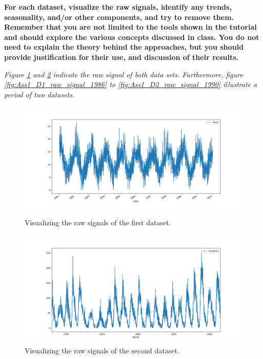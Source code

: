 \item \textbf{For each dataset, visualize the raw signals, identify any trends, seasonality, and/or other components, and try to remove them. Remember that you are not limited to the tools shown in the tutorial and should explore the various concepts discussed in class. You do not need to explain the theory behind the approaches, but you should provide justification for their use, and discussion of their results.}


\textit{Figure \ref{fig:Ass1_D1_raw_signal} and \ref{fig:Ass1_D2_raw_signal} indicate the raw signal of both data sets. Furthermore, figure \ref{fig:Ass1_D1_raw_signal_1986} to  \ref{fig:Ass1_D2_raw_signal_1990} illustrate a period of two datasets. }

\begin{figure}[H]
    \centering
    \begin{minipage}[b]{1\textwidth}
        \includegraphics[width=\textwidth]{figures/Ass1/Ass1_D1_raw_signal.png}
    \end{minipage}
    \caption{Visualizing the raw signals of the first dataset.}
    \label{fig:Ass1_D1_raw_signal}
\end{figure}

\begin{figure}[H]
    \centering
    \begin{minipage}[b]{1\textwidth}
        \includegraphics[width=\textwidth]{figures/Ass1/Ass1_D2_raw_signal.png}
    \end{minipage}
    \caption{Visualizing the raw signals of the second dataset.}
    \label{fig:Ass1_D2_raw_signal}
\end{figure}

